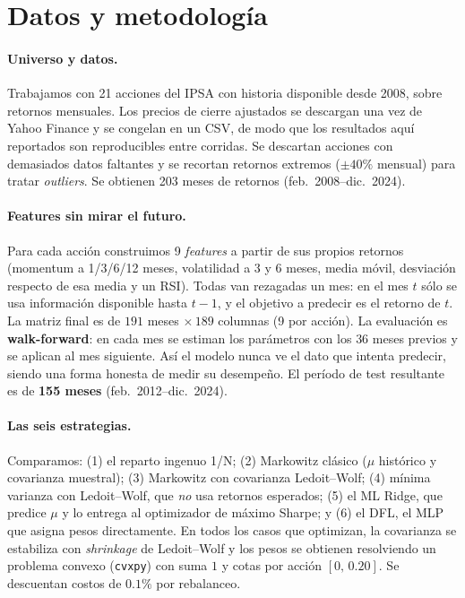 \documentclass[11pt]{article}
\begin{document}
\section{Datos y metodología}
\label{sec:metodologia}

\paragraph{Universo y datos.} Trabajamos con 21 acciones del IPSA con historia disponible desde 2008,
sobre retornos mensuales. Los precios de cierre ajustados se descargan una vez de Yahoo Finance y se congelan en un CSV, de modo que los resultados aquí reportados son reproducibles entre corridas. Se descartan
acciones con demasiados datos faltantes y se recortan retornos extremos ($\pm 40\%$ mensual) para
tratar \emph{outliers}. Se obtienen 203 meses de retornos (feb.~2008--dic.~2024).

\paragraph{Features sin mirar el futuro.} Para cada acción construimos 9 \emph{features} a partir de
sus propios retornos (momentum a 1/3/6/12 meses, volatilidad a 3 y 6 meses, media móvil, desviación
respecto de esa media y un RSI). Todas van rezagadas un mes: en el mes $t$ sólo se usa información
disponible hasta $t-1$, y el objetivo a predecir es el retorno de $t$. La matriz final es de $191$
meses $\times\, 189$ columnas (9 por acción). La evaluación es \textbf{walk-forward}: en cada mes se
estiman los parámetros con los $36$ meses previos y se aplican al mes siguiente. Así el modelo nunca
ve el dato que intenta predecir, siendo una forma honesta de medir su desempeño. El período de
test resultante es de \textbf{155 meses} (feb.~2012--dic.~2024).

\paragraph{Las seis estrategias.} Comparamos: (1) el reparto ingenuo 1/N; (2) Markowitz clásico
($\mu$ histórico y covarianza muestral); (3) Markowitz con covarianza Ledoit--Wolf; (4) mínima
varianza con Ledoit--Wolf, que \emph{no} usa retornos esperados; (5) el ML Ridge, que predice $\mu$ y
lo entrega al optimizador de máximo Sharpe; y (6) el DFL, el MLP que asigna pesos directamente. En
todos los casos que optimizan, la covarianza se estabiliza con \emph{shrinkage} de Ledoit--Wolf y los
pesos se obtienen resolviendo un problema convexo (\texttt{cvxpy}) con suma $1$ y cotas por acción
$[0,\,0.20]$. Se descuentan costos de $0.1\%$ por rebalanceo.
\end{document}
